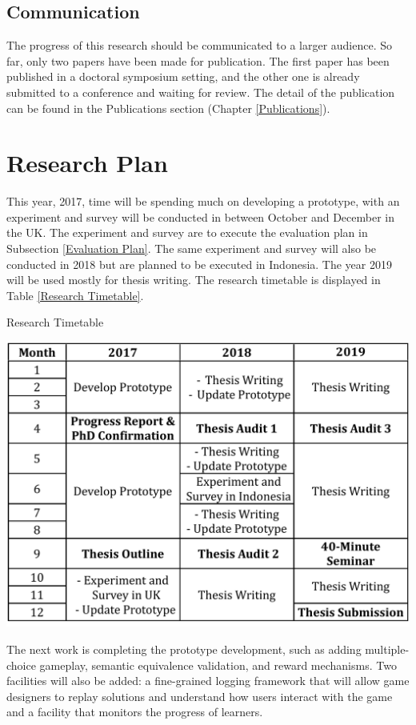 \documentclass[12pt, a4paper]{report} \usepackage[titletoc]{appendix}
\begin{document}
\section{Communication}
The progress of this research should be communicated to a larger audience. So far, only two papers have been made for publication. The first paper has been published in a doctoral symposium setting, and the other one is already submitted to a conference and waiting for review. The detail of the publication can be found in the Publications section (Chapter \ref{Publications}).

\chapter{Research Plan}
\label{Research Plan}
This year, 2017, time will be spending much on developing a prototype, with an experiment and survey will be conducted in between October and December in the UK. The experiment and survey are to execute the evaluation plan in Subsection \ref{Evaluation Plan}. The same experiment and survey will also be conducted in 2018 but are planned to be executed in Indonesia. The year 2019 will be used mostly for thesis writing. The research timetable is displayed in Table \ref{Research Timetable}. 

\begin {table}[th]
\caption {Research Timetable} 
\includegraphics[width=\textwidth]{timetable}
\label{Research Timetable}
\end{table}

The next work is completing the prototype development, such as adding multiple-choice gameplay, semantic equivalence validation, and reward mechanisms. Two facilities will also be added: a fine-grained logging framework that will allow game designers to replay solutions and understand how users interact with the game and a facility that monitors the progress of learners. 
\end{document}
